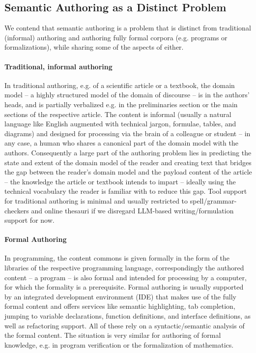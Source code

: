 \documentclass[runningheads]{llncs}
\begin{document}
\subsection{Semantic Authoring as a Distinct Problem}
We contend that semantic authoring is a problem that is distinct from traditional
(informal) authoring and authoring fully formal corpora (e.g. programs or formalizations),
while sharing some of the aspects of either.

\paragraph{Traditional, informal authoring}
In traditional authoring, e.g. of a scientific article or a textbook, the domain model --
a highly structured model of the domain of discourse -- is in the authors' heads, and is
partially verbalized e.g. in the preliminaries section or the main sections of the
respective article. The content is informal (usually a natural language like English
augmented with technical jargon, formulae, tables, and diagrams) and designed for
processing via the brain of a colleague or student -- in any case, a human who shares a
canonical part of the domain model with the authors. Consequently a large part of the
authoring problem lies in predicting the state and extent of the domain model of the
reader and creating text that bridges the gap between the reader's domain model and the
payload content of the article -- the knowledge the article or textbook intends to impart
-- ideally using the technical vocabulary the reader is familiar with to reduce this
gap. Tool support for traditional authoring is minimal and usually restricted to
spell/grammar-checkers and online thesauri if we disregard LLM-based writing/formulation
support for now.

\paragraph{Formal Authoring}
In programming, the content commons is given formally in the form of the libraries of the
respective programming language, correspondingly the authored content -- a program -- is
also formal and intended for processing by a computer, for which the formality is a
prerequisite. Formal authoring is usually supported by an integrated development
environment (IDE) that makes use of the fully formal content and offers services like
semantic highlighting, tab completion, jumping to variable declarations, function
definitions, and interface definitions, as well as refactoring support. All of these rely
on a syntactic/semantic analysis of the formal content. The situation is very similar for
authoring of formal knowledge, e.g. in program verification or the formalization of
mathematics.
\end{document}
